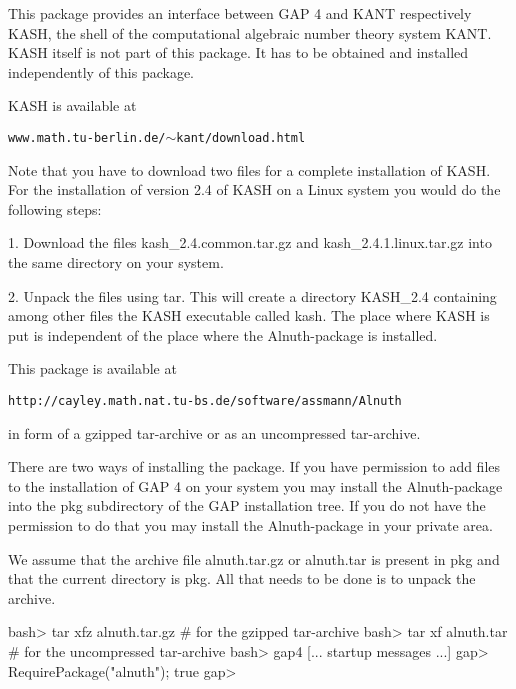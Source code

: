 

This package provides an interface between GAP 4 and KANT respectively
KASH, the shell
of the computational algebraic number theory system KANT.  KASH itself
is not part of this package.  It has to be obtained and installed
independently of this package.

 
KASH is available at
\smallskip 
          \centerline{\tt www.math.tu-berlin.de/$\sim$kant/download.html}
\smallskip 
Note that you have to download two files for a complete installation
of KASH.  For the installation of version 2.4 of KASH on a Linux
system you would do the following steps:
{\parindent=25pt
\item{1.} Download the files
    kash_2.4.common.tar.gz and kash_2.4.1.linux.tar.gz
    into the same directory on your system.
 
\item{2.} Unpack the files using tar.  This will create a directory
    KASH_2.4 containing among other files the KASH executable called
    kash.  The place where KASH is put is independent of the place
    where the Alnuth-package is installed.
    \smallskip
}


 
This package is available at
\smallskip 
   \centerline{\tt http://cayley.math.nat.tu-bs.de/software/assmann/Alnuth}
 
in form of a gzipped tar-archive or as an uncompressed tar-archive.
 
There are two ways of installing the package.  If you have permission
to add files to the installation of GAP 4 on your system you may
install the Alnuth-package into the pkg subdirectory of the GAP
installation tree.  If you do not have the permission to do that you
may install the Alnuth-package in your private area.

\medskip
{}
 
\smallskip
    We assume that the archive file alnuth.tar.gz or alnuth.tar is
    present in pkg and that the current directory is pkg.  All that needs
    to be done is to unpack the archive.
 
\beginexample
    bash> tar xfz alnuth.tar.gz        # for the gzipped tar-archive
    bash> tar xf alnuth.tar         # for the uncompressed tar-archive
    bash> gap4
    [... startup messages ...]
    gap> RequirePackage("alnuth");
    true
    gap>
\endexample

